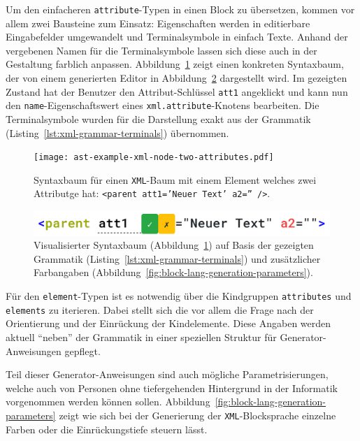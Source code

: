 \documentclass[paper=a4,fontsize=12pt,parskip=half]{scrartcl}
\begin{document}
Um den einfacheren \texttt{attribute}-Typen in einen Block zu übersetzen, kommen vor allem zwei Bausteine zum Einsatz: Eigenschaften werden in editierbare Eingabefelder umgewandelt und Terminalsymbole in einfach Texte. Anhand der vergebenen Namen für die Terminalsymbole lassen sich diese auch in der Gestaltung farblich anpassen. Abbildung~\ref{fig:ast-example-xml-node-two-attributes} zeigt einen konkreten Syntaxbaum, der von einem generierten Editor in Abbildung~\ref{fig:example-xml-generated} dargestellt wird. Im gezeigten Zustand hat der Benutzer den Attribut-Schlüssel \texttt{att1} angeklickt und kann nun den \texttt{name}-Eigenschaftswert eines \texttt{xml.attribute}-Knotens bearbeiten. Die Terminalsymbole wurden für die Darstellung exakt aus der Grammatik (Listing~\ref{lst:xml-grammar-terminals}) übernommen.

\begin{figure}[p]
  \centering\texttt{[image: ast-example-xml-node-two-attributes.pdf]}
  \caption{Syntaxbaum für einen \texttt{XML}-Baum mit einem Element welches zwei Attributge hat: \texttt{<parent att1='Neuer Text' a2='' />}.}
  \label{fig:ast-example-xml-node-two-attributes}
\end{figure}

\begin{figure}[p]
  \centering\includegraphics[width=\linewidth]{screenshot-generated-xml.png}
  \caption{Visualisierter Syntaxbaum (Abbildung~\ref{fig:ast-example-xml-node-two-attributes}) auf Basis der gezeigten Grammatik (Listing~\ref{lst:xml-grammar-terminals}) und zusätzlicher Farbangaben (Abbildung~\ref{fig:block-lang-generation-parameters}).}
  \label{fig:example-xml-generated}
\end{figure}

Für den \texttt{element}-Typen ist es notwendig über die Kindgruppen \texttt{attributes} und \texttt{elements} zu iterieren. Dabei stellt sich die vor allem die Frage nach der Orientierung und der Einrückung der Kindelemente. Diese Angaben werden aktuell \enquote{neben} der Grammatik in einer speziellen Struktur für Generator-Anweisungen gepflegt.

Teil dieser Generator-Anweisungen sind auch mögliche Parametrisierungen, welche auch von Personen ohne tiefergehenden Hintergrund in der Informatik vorgenommen werden können sollen. Abbildung~\ref{fig:block-lang-generation-parameters} zeigt wie sich bei der Generierung der \texttt{XML}-Blocksprache einzelne Farben oder die Einrückungstiefe steuern lässt.
\end{document}

